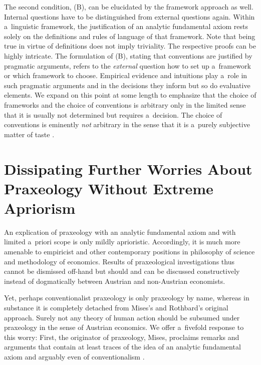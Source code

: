 The second condition, (B), can be elucidated by the framework approach as well. Internal questions have to be distinguished from external questions again. Within a~linguistic framework, the justification of an analytic fundamental axiom rests solely on the definitions and rules of language of that framework. Note that being true in virtue of definitions does not imply triviality. The respective proofs can be highly intricate. The formulation of (B), stating that conventions are justified by pragmatic arguments, refers to the \textit{external} question how to set up a~framework or which framework to choose. Empirical evidence and intuitions play a~role in such pragmatic arguments and in the decisions they inform but so do evaluative elements. We expand on this point at some length to emphasize that the choice of frameworks and the choice of conventions is arbitrary only in the limited sense that it is usually not determined but requires a~decision. The choice of conventions is eminently \textit{not} arbitrary in the sense that it is a~purely subjective matter of taste 
\parencites[see also][p.3379]{linsbichler_austrian_2021}[][]{dambock_factvalue_2024}.%




\section{Dissipating Further Worries About Praxeology Without Extreme Apriorism}

An explication of praxeology with an analytic fundamental axiom and with limited a~priori scope is only mildly aprioristic. Accordingly, it is much more amenable to empiricist and other contemporary positions in philosophy of science and methodology of economics. Results of praxeological investigations thus cannot be dismissed off-hand but should and can be discussed constructively instead of dogmatically between Austrian and non-Austrian economists.



Yet, perhaps conventionalist praxeology is only praxeology by name, whereas in substance it is completely detached from Mises's and Rothbard's original approach. Surely not any theory of human action should be subsumed under praxeology in the sense of Austrian economics. We offer a~fivefold response to this worry: First, the originator of praxeology, Mises, proclaims remarks and arguments that contain at least traces of the idea of an analytic fundamental axiom and arguably even of conventionalism 
\parencite[][pp.3376–3378]{linsbichler_austrian_2021}.%




